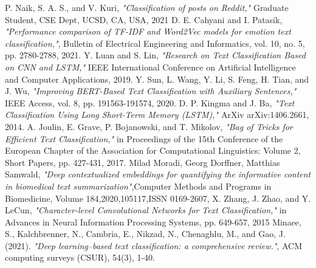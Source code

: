 \documentclass[conference]{IEEEtran}
\begin{document}
\begin{thebibliography}{1}

P. Naik, S. A. S., and V. Kuri, \emph{"Classification of posts on Reddit,"} Graduate Student, CSE Dept, UCSD, CA, USA, 2021
D. E. Cahyani and I. Patasik, \emph{"Performance comparison of TF-IDF and Word2Vec models for emotion text classification,"}, Bulletin of Electrical Engineering and Informatics, vol. 10, no. 5, pp. 2780-2788, 2021.
Y. Luan and S. Lin, \emph{"Research on Text Classification Based on CNN and LSTM,"} IEEE International Conference on Artificial Intelligence and Computer Applications, 2019.
Y. Sun, L. Wang, Y. Li, S. Feng, H. Tian, and J. Wu, \emph{"Improving BERT-Based Text Classification with Auxiliary Sentences,"} IEEE Access, vol. 8, pp. 191563-191574, 2020.
D. P. Kingma and J. Ba, \emph{"Text Classification Using Long Short-Term Memory (LSTM),"} ArXiv arXiv:1406.2661, 2014.
A. Joulin, E. Grave, P. Bojanowski, and T. Mikolov, \emph{"Bag of Tricks for Efficient Text Classification,"} in Proceedings of the 15th Conference of the European Chapter of the Association for Computational Linguistics: Volume 2, Short Papers, pp. 427-431, 2017.
Milad Moradi, Georg Dorffner, Matthias Samwald,
\emph{"Deep contextualized embeddings for quantifying the informative content in biomedical text summarization"},Computer Methods and Programs in Biomedicine, Volume 184,2020,105117,ISSN 0169-2607,
X. Zhang, J. Zhao, and Y. LeCun, \emph{"Character-level Convolutional Networks for Text Classification,"} in Advances in Neural Information Processing Systems, pp. 649-657, 2015
Minaee, S., Kalchbrenner, N., Cambria, E., Nikzad, N., Chenaghlu, M., and  Gao, J. (2021). \emph{"Deep learning--based text classification: a comprehensive review."}, ACM computing surveys (CSUR), 54(3), 1-40.


\end{thebibliography}







%
%
%




\end{document}
